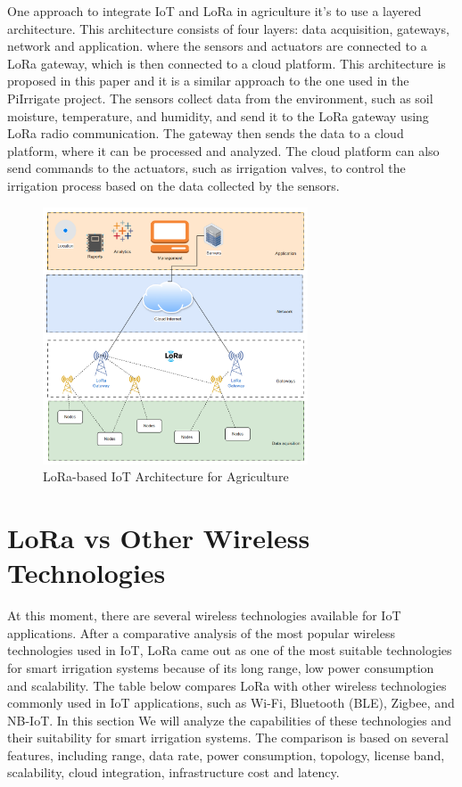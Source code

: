 One approach to integrate IoT and LoRa in agriculture it's to use a layered architecture.
This architecture consists of four layers: data acquisition, gateways, network and application.
where the sensors and actuators are connected to a LoRa gateway, which is then connected to a cloud platform. 
This architecture is proposed in this paper \cite{loraBasedIoTPlatform} and it is a similar approach to the one used in the 
PiIrrigate project. The sensors collect data from the environment, such as soil moisture, temperature, and humidity,
and send it to the LoRa gateway using LoRa radio communication. The gateway then sends the data to a cloud platform, 
where it can be processed and analyzed. The cloud platform can also send commands to the actuators, such as irrigation valves, 
to control the irrigation process based on the data collected by the sensors. 

\begin{figure}[H]
    \centering
    \includegraphics[width=0.7\textwidth]{images/loraWan.png}
    \caption{LoRa-based IoT Architecture for Agriculture}
    \label{fig:lora_architecture}
\end{figure}

\section{LoRa vs Other Wireless Technologies}
At this moment, there are several wireless technologies available for IoT applications. After a 
comparative analysis of the most popular wireless technologies used in IoT, LoRa came out as one of the most suitable
technologies for smart irrigation systems because of its long range, low power consumption and scalability.
The table below compares LoRa with other wireless technologies commonly used in IoT applications, such as Wi-Fi, Bluetooth (BLE), 
Zigbee, and NB-IoT. In this section We will analyze the capabilities of these technologies
and their suitability for smart irrigation systems. The comparison is based on several features, 
including range, data rate, power consumption, topology, license band, scalability, cloud integration, infrastructure cost and latency.

